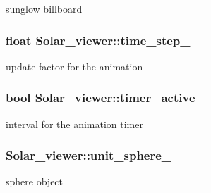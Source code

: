 sunglow billboard 

\subsubsection[{\texorpdfstring{time\+\_\+step\+\_\+}{time_step_}}]{\setlength{\rightskip}{0pt plus 5cm}float Solar\+\_\+viewer\+::time\+\_\+step\+\_\+\hspace{0.3cm}{\ttfamily [private]}}\hypertarget{classSolar__viewer_ad2ff1703788f0c694bd8e6e8be5c3be5}{}\label{classSolar__viewer_ad2ff1703788f0c694bd8e6e8be5c3be5}


update factor for the animation 

\subsubsection[{\texorpdfstring{timer\+\_\+active\+\_\+}{timer_active_}}]{\setlength{\rightskip}{0pt plus 5cm}bool Solar\+\_\+viewer\+::timer\+\_\+active\+\_\+\hspace{0.3cm}{\ttfamily [private]}}\hypertarget{classSolar__viewer_aedc75568a6aafd2ecf8245ed518f6214}{}\label{classSolar__viewer_aedc75568a6aafd2ecf8245ed518f6214}


interval for the animation timer 

\subsubsection[{\texorpdfstring{unit\+\_\+sphere\+\_\+}{unit_sphere_}}]{ Solar\+\_\+viewer\+::unit\+\_\+sphere\+\_\+\hspace{0.3cm}{\ttfamily [private]}}\hypertarget{classSolar__viewer_a47d90d63f22fd4e9e58651e9e9c7baef}{}\label{classSolar__viewer_a47d90d63f22fd4e9e58651e9e9c7baef}


sphere object 

